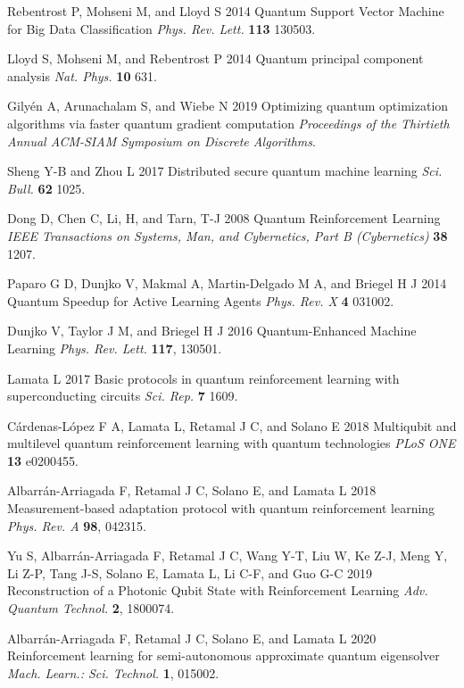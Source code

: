 \documentclass[12pt]{iopart}
\begin{document}
\begin{thebibliography}{999}
 Rebentrost P, Mohseni M, and Lloyd S 2014 Quantum Support Vector Machine for Big Data Classification {\it Phys. Rev. Lett.} {\bf 113} 130503.  

 Lloyd S, Mohseni M, and Rebentrost P 2014 Quantum principal component analysis {\it Nat. Phys.} {\bf 10} 631.

 Gily\'en A, Arunachalam S, and Wiebe N 2019 Optimizing quantum optimization algorithms via faster quantum gradient computation {\it Proceedings of the Thirtieth Annual ACM-SIAM Symposium on Discrete Algorithms}.
 
 Sheng Y-B and Zhou L 2017 Distributed secure quantum machine learning {\it Sci. Bull.} {\bf 62} 1025.
 
 
 Dong D, Chen C, Li, H, and Tarn, T-J 2008 Quantum Reinforcement Learning {\it IEEE Transactions on Systems, Man, and Cybernetics, Part B (Cybernetics) } {\bf 38} 1207.

 Paparo G D, Dunjko V, Makmal A, Martin-Delgado M A, and Briegel H J 2014 Quantum Speedup for Active Learning Agents {\it Phys. Rev. X} {\bf 4} 031002. 

 Dunjko V, Taylor J M, and Briegel H J 2016 Quantum-Enhanced Machine Learning
{\it Phys. Rev. Lett.} {\bf 117}, 130501. 

 Lamata L 2017  Basic protocols in quantum reinforcement learning with superconducting circuits {\it Sci. Rep.} {\bf 7} 1609.

  C\'ardenas-L\'opez F A, Lamata L, Retamal J C, and Solano E 2018 Multiqubit and multilevel quantum reinforcement learning with quantum technologies {\it PLoS ONE} {\bf 13} e0200455.

 Albarr\'an-Arriagada F, Retamal J C, Solano E, and Lamata L 2018
  Measurement-based adaptation protocol with quantum reinforcement learning {\it Phys. Rev. A} {\bf 98}, 042315.

 Yu S, Albarr\'an-Arriagada F, Retamal J C, Wang Y-T, Liu W,  Ke Z-J, 
    Meng Y,  Li Z-P, Tang J-S,  Solano E, Lamata L, Li C-F, and Guo G-C 2019 Reconstruction of a Photonic Qubit State with Reinforcement Learning {\it Adv. Quantum Technol.} {\bf 2}, 1800074. 

 Albarr\'an-Arriagada F, Retamal J C, Solano E, and Lamata L 2020
    Reinforcement learning for semi-autonomous approximate quantum eigensolver {\it Mach. Learn.: Sci. Technol.} {\bf 1}, 015002.
    





\end{thebibliography}
\end{document}
